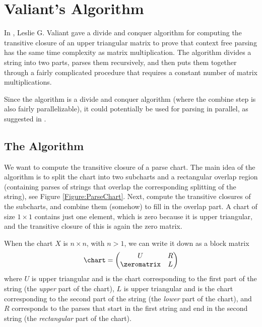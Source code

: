 \chapter{Valiant's Algorithm}
\label{Section:Valiant}
\label{Valiant}
In \cite{Valiant}, Leslie G. Valiant gave a divide and conquer algorithm for computing the transitive closure of an upper triangular matrix to prove that context free parsing has the same time complexity as matrix multiplication. The algorithm divides a string into two parts, parses them recursively, and then puts them together through a fairly complicated procedure that requires a constant number of matrix multiplications.

Since the algorithm is a divide and conquer algorithm (where the combine step is also fairly parallelizable), it could potentially be used for parsing in parallel, as suggested in \cite{JP-PP}.

\section{The Algorithm}
We want to compute the transitive closure of a parse chart. The main idea of the algorithm is to split the chart into two subcharts and a rectangular overlap region (containing parses of strings that overlap the corresponding splitting of the string), see Figure \ref{Figure:ParseChart}. Next, compute the transitive closures of the subcharts, and combine them (somehow) to fill in the overlap part. A chart of size $1 \times 1$ contains just one element, which is zero because it is upper triangular, and the transitive closure of this is again the zero matrix.

\label{Section:Subdivision-in-Specification}
When the chart $X$ is $n \times n$, with $n > 1$, we can write it down as a block matrix 
\begin{equation*}
  \chart = 
  \begin{pmatrix}
    U & R \\
    \zeromatrix & L
  \end{pmatrix}
\end{equation*}
where $U$ is upper triangular and is the chart corresponding to the first part of the string (the \emph{upper} part of the chart), $L$ is upper triangular and is the chart corresponding to the second part of the string (the \emph{lower} part of the chart), and $R$ corresponds to the parses that start in the first string and end in the second string (the \emph{rectangular} part of the chart).

